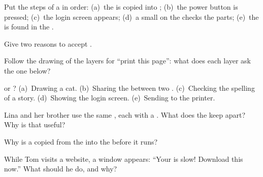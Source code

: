 \begin{exercise}[$\star$]\label{exo:g4:programs-and-operating-system:4}
Put the steps of a  in order: (a)~the  is copied into
; (b)~the power button is pressed; (c)~the login screen appears; (d)~a
small  on the  checks the parts; (e)~the 
is found in the .
\end{exercise}

\begin{exercise}[$\star$]\label{exo:g4:programs-and-operating-system:5}
Give two reasons to accept .
\end{exercise}

\begin{exercise}[$\star$]\label{exo:g4:programs-and-operating-system:6}
Follow the drawing of the layers for ``print this page'': what does each layer
ask the one below?
\end{exercise}

\begin{exercise}[$\star$]\label{exo:g4:programs-and-operating-system:7}
 or ? (a)~Drawing a cat. (b)~Sharing the 
between two . (c)~Checking the spelling of a story. (d)~Showing the
login screen. (e)~Sending  to the printer.
\end{exercise}

\begin{exercise}[$\star\star$]\label{exo:g4:programs-and-operating-system:8}
Lina and her brother use the same , each with a . What does
the  keep apart? Why is that useful?
\end{exercise}

\begin{exercise}[$\star\star$]\label{exo:g4:programs-and-operating-system:9}
Why is a  copied from the  into the  before it runs?
\end{exercise}

\begin{exercise}[$\star\star$]\label{exo:g4:programs-and-operating-system:10}
While Tom visits a website, a window appears: ``Your  is slow!
Download this  now.'' What should he do, and why?
\end{exercise}
